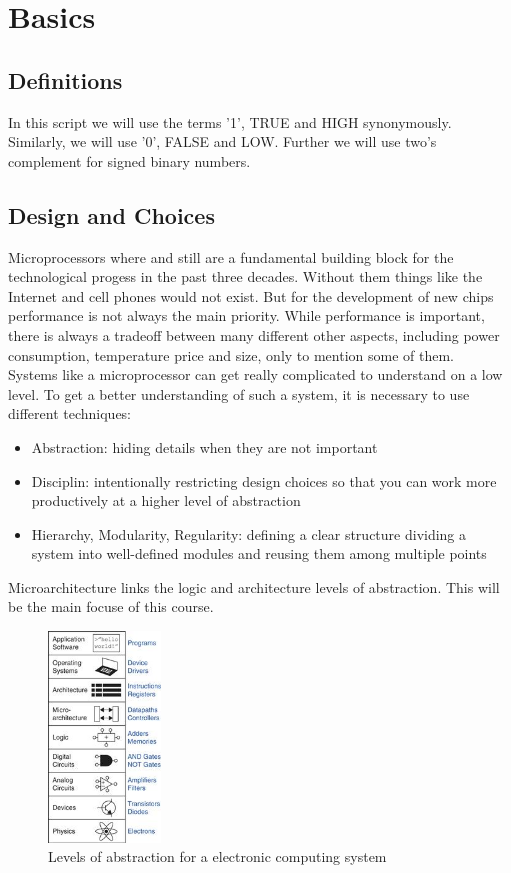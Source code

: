 \documentclass[a4paper]{report}
\begin{document}

\chapter{Basics}

\section{Definitions}

In this script we will use the terms '1', TRUE and HIGH synonymously. Similarly, we will use '0', FALSE and LOW. Further 
we will use two's complement for signed binary numbers.

\section{Design and Choices}

Microprocessors where and still are a fundamental building block for the technological progess in the past
three decades. Without them things like the Internet and cell phones would not exist. But for the
development of new chips performance is not always the main priority. While performance is important,
there is always a tradeoff between many different other aspects, including power consumption, temperature
price and size, only to mention some of them. \\

Systems like a microprocessor can get really complicated to understand on a low level. To get a better
understanding of such a system, it is necessary to use different techniques:
\begin{itemize}
    \item Abstraction: hiding details when they are not important
    \item Disciplin: intentionally restricting design choices so that you can work more productively at a higher level of abstraction
    \item Hierarchy, Modularity, Regularity: defining a clear structure dividing a system into well-defined modules and reusing them among multiple points
\end{itemize} 

Microarchitecture links the logic and architecture levels of abstraction. This will be the main focuse of this course.

\begin{figure}[h]
    \centering
    \includegraphics[width=3cm]{abstractionLevels.jpg}
    \caption{Levels of abstraction for a electronic computing system}
\end{figure}
\end{document}
